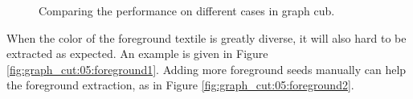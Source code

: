 \documentclass[paper=a4, fontsize=11pt]{scrartcl}
\begin{document}
\begin{figure}[h]
\centering
{}
\caption{ Comparing the performance on different cases in graph cub. }
\label{fig:graph_cut:05}
\end{figure}

When the color of the foreground textile is greatly diverse, it will also hard to be extracted as expected.
An example is given in Figure \ref{fig:graph_cut:05:foreground1}.
Adding more foreground seeds manually can help the foreground extraction, as in Figure \ref{fig:graph_cut:05:foreground2}.



\end{document}
